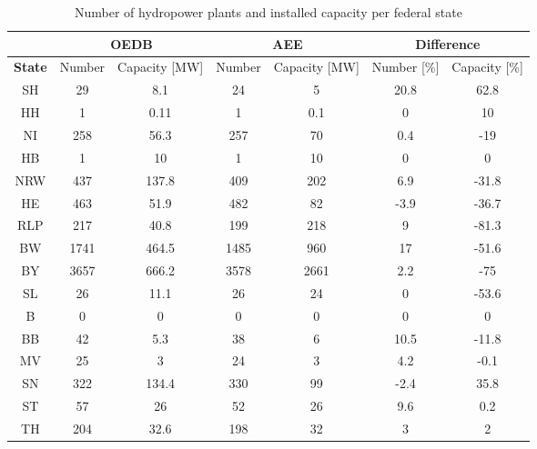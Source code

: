 \begin{table}
\footnotesize 
 \caption[Number of hydropower plants and installed capacity per federal state]{Number of hydropower plants and installed capacity per federal state}
 \centering
 \label{oedb_aee_diff}
 \begin{tabular}{|c|cc|cc| cc|}
  \cline{2-7}
  \multicolumn{0}{c|}{} &\multicolumn{2}{|c}{\textbf{OEDB \cite{oedb}}}&\multicolumn{2}{|c|}{\textbf{AEE \cite{aee}}}&\multicolumn{2}{c|}{\textbf{Difference}} \\
  \hline
  \textbf{State} & Number 	& 	Capacity [\unit{MW}] 	&	Number 	& 	Capacity [\unit{MW}] 	&	Number [\unit{\%}] 	&	Capacity [\unit{\%}] \\
  \hline
  SH	&	29	&	8.1		&	24	&	5		&	20.8		&	62.8	\\
  HH	&	1	&	0.11		&	1	&	0.1		&	0		&	10	\\
  NI	&	258	&	56.3		&	257	&	70		&	0.4		&	-19	\\
  HB	&	1	&	10		&	1	&	10		&	0		&	0	\\
  NRW	&	437	&	137.8		&	409	&	202		&	6.9		&	-31.8	\\
  HE	&	463	&	51.9		&	482	&	82		&	-3.9		&	-36.7	\\
  RLP	&	217	&	40.8		&	199	&	218		&	9		&	-81.3	\\
  BW	&	1741	&	464.5		&	1485	&	960		&	17		&	-51.6	\\	
  BY	&	3657	&	666.2		&	3578	&	2661		&	2.2		&	-75	\\
  SL	&	26	&	11.1		&	26	&	24		&	0		&	-53.6	\\
  B	&	0	&	0		&	0	&	0		&	0		&	0	\\
  BB	&	42	&	5.3		&	38	&	6		&	10.5		&	-11.8	\\
  MV	&	25	&	3		&	24	&	3		&	4.2		&	-0.1	\\
  SN	&	322	&	134.4		&	330	&	99		&	-2.4		&	35.8	\\
  ST	&	57	&	26		&	52	&	26		&	9.6		&	0.2	\\
  TH	&	204	&	32.6		&	198	&	32		&	3		&	2	\\
  \hline
 \end{tabular} 
\end{table}




